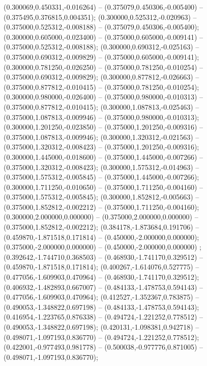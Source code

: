  (0.300069,0.450331,-0.016264) -- (0.375079,0.450306,-0.005400) -- (0.375495,0.376815,0.004351);
 (0.300000,0.525312,-0.020963) -- (0.375000,0.525312,-0.008188) -- (0.375079,0.450306,-0.005400);
 (0.300000,0.605000,-0.023400) -- (0.375000,0.605000,-0.009141) -- (0.375000,0.525312,-0.008188);
 (0.300000,0.690312,-0.025163) -- (0.375000,0.690312,-0.009829) -- (0.375000,0.605000,-0.009141);
 (0.300000,0.781250,-0.026250) -- (0.375000,0.781250,-0.010254) -- (0.375000,0.690312,-0.009829);
 (0.300000,0.877812,-0.026663) -- (0.375000,0.877812,-0.010415) -- (0.375000,0.781250,-0.010254);
 (0.300000,0.980000,-0.026400) -- (0.375000,0.980000,-0.010313) -- (0.375000,0.877812,-0.010415);
 (0.300000,1.087813,-0.025463) -- (0.375000,1.087813,-0.009946) -- (0.375000,0.980000,-0.010313);
 (0.300000,1.201250,-0.023850) -- (0.375000,1.201250,-0.009316) -- (0.375000,1.087813,-0.009946);
 (0.300000,1.320312,-0.021563) -- (0.375000,1.320312,-0.008423) -- (0.375000,1.201250,-0.009316);
 (0.300000,1.445000,-0.018600) -- (0.375000,1.445000,-0.007266) -- (0.375000,1.320312,-0.008423);
 (0.300000,1.575312,-0.014963) -- (0.375000,1.575312,-0.005845) -- (0.375000,1.445000,-0.007266);
 (0.300000,1.711250,-0.010650) -- (0.375000,1.711250,-0.004160) -- (0.375000,1.575312,-0.005845);
 (0.300000,1.852812,-0.005663) -- (0.375000,1.852812,-0.002212) -- (0.375000,1.711250,-0.004160);
 (0.300000,2.000000,0.000000) -- (0.375000,2.000000,0.000000) -- (0.375000,1.852812,-0.002212);
 (0.384178,-1.873684,0.191706) -- (0.459870,-1.871518,0.171814) -- (0.450000,-2.000000,0.000000);
 (0.375000,-2.000000,0.000000) -- (0.450000,-2.000000,0.000000) ;
 (0.392642,-1.744710,0.368503) -- (0.468930,-1.741170,0.329512) -- (0.459870,-1.871518,0.171814);
 (0.400267,-1.614076,0.527775) -- (0.477056,-1.609903,0.470964) -- (0.468930,-1.741170,0.329512);
 (0.406932,-1.482893,0.667007) -- (0.484133,-1.478753,0.594143) -- (0.477056,-1.609903,0.470964);
 (0.412527,-1.352367,0.783875) -- (0.490053,-1.348822,0.697198) -- (0.484133,-1.478753,0.594143);
 (0.416954,-1.223765,0.876338) -- (0.494724,-1.221252,0.778512) -- (0.490053,-1.348822,0.697198);
 (0.420131,-1.098381,0.942718) -- (0.498071,-1.097193,0.836770) -- (0.494724,-1.221252,0.778512);
 (0.422001,-0.977493,0.981778) -- (0.500038,-0.977776,0.871005) -- (0.498071,-1.097193,0.836770);
